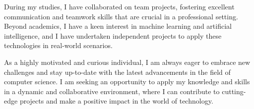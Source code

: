 
\begin{cvparagraph}
During my studies, I have collaborated on team projects, fostering excellent communication and teamwork skills that are crucial in a professional setting. Beyond academics, I have a keen interest in machine learning and artificial intelligence, and I have undertaken independent projects to apply these technologies in real-world scenarios. 

As a highly motivated and curious individual, I am always eager to embrace new challenges and stay up-to-date with the latest advancements in the field of computer science. I am seeking an opportunity to apply my knowledge and skills in a dynamic and collaborative environment, where I can contribute to cutting-edge projects and make a positive impact in the world of technology.
\end{cvparagraph}

